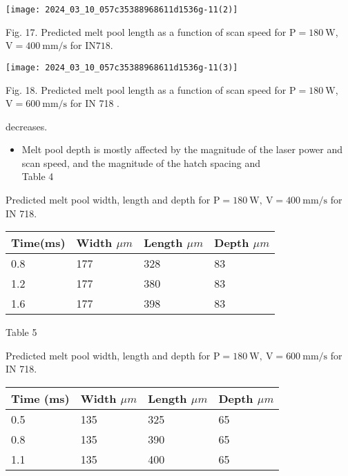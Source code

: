 \documentclass[10pt]{article}
\begin{document}
\begin{center}
\texttt{[image: 2024\_03\_10\_057c35388968611d1536g-11(2)]}
\end{center}

Fig. 17. Predicted melt pool length as a function of scan speed for $\mathrm{P}=180 \mathrm{~W}$, $\mathrm{V}=400 \mathrm{~mm} / \mathrm{s}$ for $\mathrm{IN} 718$.

\begin{center}
\texttt{[image: 2024\_03\_10\_057c35388968611d1536g-11(3)]}
\end{center}

Fig. 18. Predicted melt pool length as a function of scan speed for $\mathrm{P}=180 \mathrm{~W}$, $\mathrm{V}=600 \mathrm{~mm} / \mathrm{s}$ for IN 718 .

decreases.

\begin{itemize}
  \item Melt pool depth is mostly affected by the magnitude of the laser power and scan speed, and the magnitude of the hatch spacing and\\
Table 4
\end{itemize}

Predicted melt pool width, length and depth for $\mathrm{P}=180 \mathrm{~W}, \mathrm{~V}=400 \mathrm{~mm} / \mathrm{s}$ for IN 718.

\begin{center}
\begin{tabular}{llll}
\hline
Time(ms) & Width $\mu m$ & Length $\mu m$ & Depth $\mu m$ \\
\hline
0.8 & 177 & 328 & 83 \\
1.2 & 177 & 380 & 83 \\
1.6 & 177 & 398 & 83 \\
\hline
\end{tabular}
\end{center}

Table 5

Predicted melt pool width, length and depth for $\mathrm{P}=180 \mathrm{~W}, \mathrm{~V}=600 \mathrm{~mm} / \mathrm{s}$ for IN 718.

\begin{center}
\begin{tabular}{llll}
\hline
Time (ms) & Width $\mu m$ & Length $\mu m$ & Depth $\mu m$ \\
\hline
0.5 & 135 & 325 & 65 \\
0.8 & 135 & 390 & 65 \\
1.1 & 135 & 400 & 65 \\
\hline
\end{tabular}
\end{center}
\end{document}

